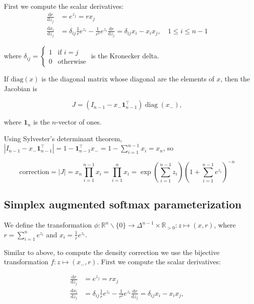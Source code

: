 \documentclass[twoside]{article}
\begin{document}
First we compute the scalar derivatives:
$$
\begin{aligned}
    \frac{\mathrm{d} r}{\mathrm{d} z_j} &= e^{z_j} = r x_j\\
    \frac{\mathrm{d} x_i}{\mathrm{d} z_j} &= \delta_{ij} \frac{1}{r} e^{z_i} - \frac{1}{r^2} e^{z_i} \frac{\mathrm{d} r}{\mathrm{d} z_j} = \delta_{ij} x_i - x_i x_j, \quad 1 \le i \le n-1
\end{aligned}
$$

where $\delta_{ij} = \begin{cases} 1 &\text{if } i = j \\ 0 &\text{otherwise}\end{cases}$ is the Kronecker delta.

If $\mathrm{diag}(x)$ is the diagonal matrix whose diagonal are the elements of $x$, then the Jacobian is

$$J = (I_{n-1} - x_- \boldsymbol{1}_{n-1}^\top) \operatorname{diag}(x_-),$$

where $\boldsymbol{1}_n$ is the $n$-vector of ones.

Using Sylvester's determinant theorem, $|I_{n-1} - x_- \boldsymbol{1}_{n-1}^\top| = 1 - \boldsymbol{1}_{n-1}^\top x_- = 1 - \sum_{i=1}^{n-1} x_i = x_n$, so

$$\mathrm{correction} = |J| = x_n \prod_{i=1}^{n-1} x_i = \prod_{i=1}^{n} x_i = \exp\left(\sum_{i=1}^{n-1} z_i\right) \left(1 + \sum_{i=1}^{n-1} e^{z_i}\right)^{-n}$$

\subsection{Simplex augmented softmax parameterization}

We define the transformation $\phi: \mathbb{R}^n \backslash \{0\} \to \Delta^{n-1} \times \mathbb{R}_{>0}: z \mapsto (x, r)$,
where $r = \sum_{i=1}^n e^{z_i}$ and $x_i = \frac{1}{r} e^{z_i}$.

Similar to above, to compute the density correction we use the bijective transformation $f: z \mapsto (x_-, r)$.
First we compute the scalar derivatives:

$$
\begin{aligned}
    \frac{\mathrm{d} r}{\mathrm{d} z_j} &= e^{z_j} = r x_j\\
    \frac{\mathrm{d} x_i}{\mathrm{d} z_j} &= \delta_{ij} \frac{1}{r} e^{z_i} - \frac{1}{r^2} e^{z_i} \frac{\mathrm{d} r}{\mathrm{d} z_j} = \delta_{ij} x_i - x_i x_j,
\end{aligned}
$$
\end{document}
